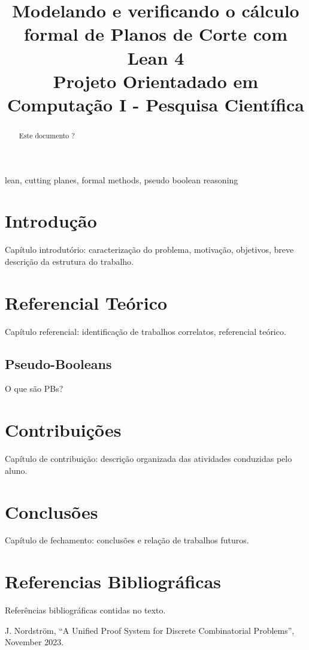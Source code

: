 \documentclass[conference]{IEEEtran}
\begin{document}
\title{Modelando e verificando o cálculo formal de Planos de Corte com Lean 4\\
{\footnotesize Projeto Orientadado em Computação I - Pesquisa Científica}
}

\author{
}

\maketitle

\begin{abstract}
    Este documento ?
\end{abstract}

\begin{IEEEkeywords}
    lean, cutting planes, formal methods, pseudo boolean reasoning
\end{IEEEkeywords}

\section{Introdução}
Capítulo introdutório: caracterização do problema, motivação, objetivos, breve descrição da estrutura do trabalho.

\section{Referencial Teórico}
Capítulo referencial: identificação de trabalhos correlatos, referencial teórico.

\subsection{Pseudo-Booleans}
O que são PBs?

\section{Contribuições}
Capítulo de contribuição: descrição organizada das atividades conduzidas pelo
aluno.

\section*{Conclusões}
Capítulo de fechamento: conclusões e relação de trabalhos futuros.

\section*{Referencias Bibliográficas}

Referências bibliográficas contidas no texto.

\begin{thebibliography}{00}
     J. Nordström, ``A Unified Proof System for Discrete Combinatorial Problems'', November 2023.
\end{thebibliography}
\vspace{12pt}
\end{document}
